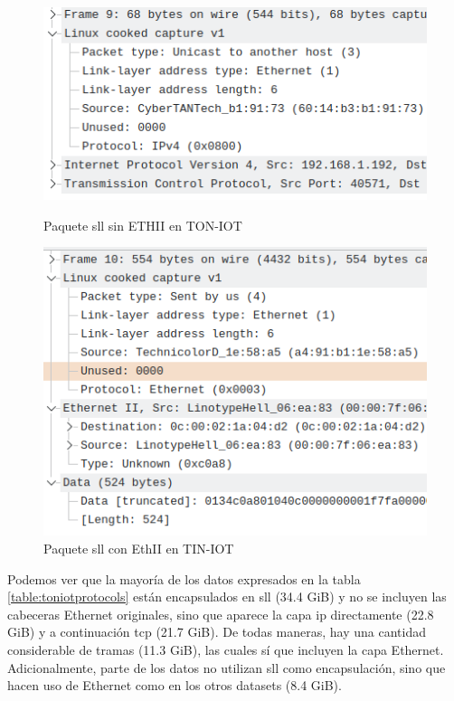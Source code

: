 \begin{figure}[H]
  \includegraphics[width=\linewidth]{media/toniot_pcap_ssl_ip_packet.png}
  \captionsetup{justification=centering}
  \caption{Paquete \acrshort{sll} sin ETHII en TON-IOT}\label{fig:toniot_pcap_ssl_ip_packet}
  \endminipage\hfill
    \includegraphics[width=\linewidth]{media/toniot_pcap_ssl_eth_packet.png}
    \captionsetup{justification=centering}
    \caption{Paquete \acrshort{sll} con EthII en TIN-IOT}\label{fig:toniot_pcap_ssl_eth_packet}
  \endminipage\hfill
\end{figure}

Podemos ver que la mayoría de los datos expresados en la tabla \ref{table:toniotprotocols} están encapsulados en \acrshort{sll} (34.4 GiB) y no se incluyen las cabeceras Ethernet originales, sino que aparece la capa \acrshort{ip} directamente (22.8 GiB) y a continuación \acrshort{tcp} (21.7 GiB). De todas maneras, hay una cantidad considerable de tramas (11.3 GiB), las cuales sí que incluyen la capa Ethernet. Adicionalmente, parte de los datos no utilizan \acrshort{sll} como encapsulación, sino que hacen uso de Ethernet como en los otros datasets (8.4 GiB). 


